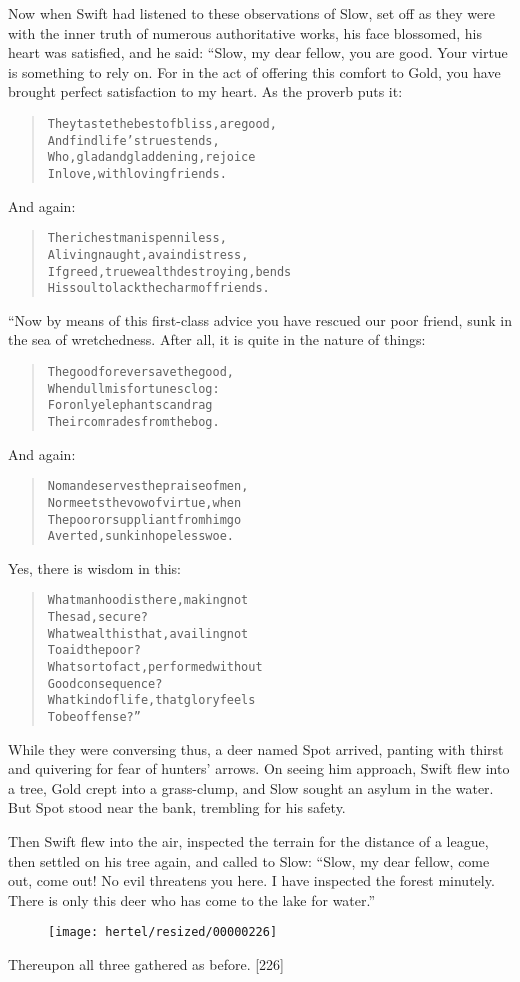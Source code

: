 \documentclass[article, twoside, 10pt]{memoir}
\renewenvironment{verbatim}{%
\begin{quote}%
\vskip -10pt%
\begin{alltt}\normalfont\small}{\end{alltt}%
\end{quote}%
\vskip -10pt
} %
\begin{document}
Now when Swift had listened to these observations of Slow, set off
as they were with the inner truth of numerous authoritative works,
his face blossomed, his heart was satisfied, and he said: “Slow, my
dear fellow, you are good. Your virtue is something to rely on. For
in the act of offering this comfort to Gold, you have brought
perfect satisfaction to my heart. As the proverb puts it:

\begin{verbatim}
They taste the best of bliss, are good,
    And find life's truest ends,
Who, glad and gladdening, rejoice
    In love, with loving friends.
\end{verbatim}
And again:

\begin{verbatim}
The richest man is penniless,
A living naught, a vain distress,
If greed, true wealth destroying, bends
His soul to lack the charm of friends.
\end{verbatim}
“Now by means of this first-class advice you have rescued our poor
friend, sunk in the sea of wretchedness. After all, it is quite in
the nature of things:

\begin{verbatim}
The good forever save the good,
    When dull misfortunes clog:
For only elephants can drag
    Their comrades from the bog.
\end{verbatim}
And again:

\begin{verbatim}
No man deserves the praise of men,
Nor meets the vow of virtue, when
The poor or suppliant from him go
Averted, sunk in hopeless woe.
\end{verbatim}
Yes, there is wisdom in this:

\begin{verbatim}
What manhood is there, making not
    The sad, secure?
What wealth is that, availing not
    To aid the poor?
What sort of act, performed without
    Good consequence?
What kind of life, that glory feels
    To be offense?”
\end{verbatim}
While they were conversing thus, a deer named Spot arrived, panting
with thirst and quivering for fear of hunters' arrows. On seeing
him approach, Swift flew into a tree, Gold crept into a
grass-clump, and Slow sought an asylum in the water. But Spot stood
near the bank, trembling for his safety.

Then Swift flew into the air, inspected the terrain for the
distance of a league, then settled on his tree again, and called to
Slow:
``Slow, my dear fellow, come out, come out! No evil threatens you here. I have inspected the forest minutely. There is only this deer who has come to the lake for water.''
\begin{figure}[p]\texttt{[image: hertel/resized/00000226]}\end{figure}Thereupon all three gathered as before. [226]
\end{document}
